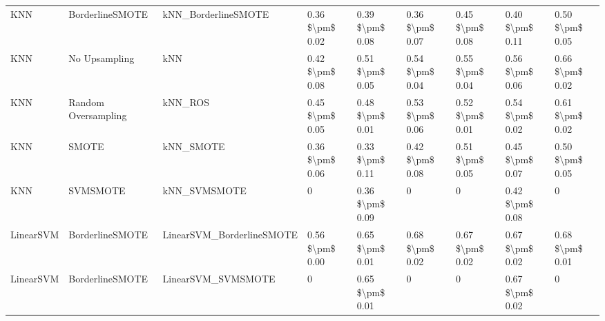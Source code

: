 \begin{tabular}{lllllllll}
                            KNN &               BorderlineSMOTE &                          kNN\_BorderlineSMOTE & 0.36 \$\textbackslash pm\$ 0.02 &           0.39 \$\textbackslash pm\$ 0.08 &       0.36 \$\textbackslash pm\$ 0.07 &        0.45 \$\textbackslash pm\$ 0.08 &                         0.40 \$\textbackslash pm\$ 0.11 & 0.50 \$\textbackslash pm\$ 0.05 \\
                            KNN &                 No Upsampling &                                          kNN & 0.42 \$\textbackslash pm\$ 0.08 &           0.51 \$\textbackslash pm\$ 0.05 &       0.54 \$\textbackslash pm\$ 0.04 &        0.55 \$\textbackslash pm\$ 0.04 &                         0.56 \$\textbackslash pm\$ 0.06 & 0.66 \$\textbackslash pm\$ 0.02 \\
                            KNN &           Random Oversampling &                                      kNN\_ROS & 0.45 \$\textbackslash pm\$ 0.05 &           0.48 \$\textbackslash pm\$ 0.01 &       0.53 \$\textbackslash pm\$ 0.06 &        0.52 \$\textbackslash pm\$ 0.01 &                         0.54 \$\textbackslash pm\$ 0.02 & 0.61 \$\textbackslash pm\$ 0.02 \\
                            KNN &                         SMOTE &                                    kNN\_SMOTE & 0.36 \$\textbackslash pm\$ 0.06 &           0.33 \$\textbackslash pm\$ 0.11 &       0.42 \$\textbackslash pm\$ 0.08 &        0.51 \$\textbackslash pm\$ 0.05 &                         0.45 \$\textbackslash pm\$ 0.07 & 0.50 \$\textbackslash pm\$ 0.05 \\
                            KNN &                      SVMSMOTE &                                 kNN\_SVMSMOTE &               0 &           0.36 \$\textbackslash pm\$ 0.09 &                     0 &                      0 &                         0.42 \$\textbackslash pm\$ 0.08 &               0 \\
                      LinearSVM &               BorderlineSMOTE &                    LinearSVM\_BorderlineSMOTE & 0.56 \$\textbackslash pm\$ 0.00 &           0.65 \$\textbackslash pm\$ 0.01 &       0.68 \$\textbackslash pm\$ 0.02 &        0.67 \$\textbackslash pm\$ 0.02 &                         0.67 \$\textbackslash pm\$ 0.02 & 0.68 \$\textbackslash pm\$ 0.01 \\
                      LinearSVM &               BorderlineSMOTE &                           LinearSVM\_SVMSMOTE &               0 &           0.65 \$\textbackslash pm\$ 0.01 &                     0 &                      0 &                         0.67 \$\textbackslash pm\$ 0.02 &               0 \\

\end{tabular}
